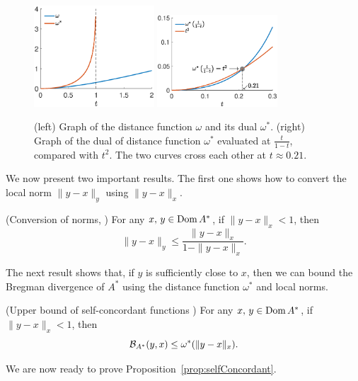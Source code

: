 \begin{figure}[ht]
	\centering
	\includegraphics[width=0.4\textwidth]{figs/self_concordance/omega.eps}
	\includegraphics[width=0.4\textwidth]{figs/self_concordance/omega_star.eps}
	\caption{(left) Graph of the distance function $\omega$ and its dual $\omega^*$. (right) Graph of the dual of distance function $\omega^*$ evaluated at $\frac{t}{1-t}$, compared with $t^2$. The two curves cross each other at $t\approx 0.21$.}
	\label{fig:omega}
\end{figure}

We now present two important results. The first one shows how to convert the local norm $\|y-x\|_y$ using $\|y-x\|_x$.
\begin{proposition}\label{prop:conversion_norm}
	(Conversion of norms, \citep[Theorem 4.1.5]{nesterov2003introductory}) For any $x,\,y\in\operatorname{\mathrm{Dom}} A^*$, if $\|y-x\|_x<1$, then
	\[
		\|y-x\|_y \leq \frac{\|y-x\|_x}{1-\|y-x\|_x}.
	\]
\end{proposition}

The next result shows that, if $y$ is sufficiently close to $x$, then we can bound the Bregman divergence of $A^*$ using the distance function $\omega^*$ and local norms.
\begin{proposition}(Upper bound of self-concordant functions \citep[Theorem 4.1.8]{nesterov2003introductory}) \label{prop:upper_bound_self_concordance}
	For any $x,\,y\in\operatorname{\mathrm{Dom}} A^*$, if $\|y-x\|_x<1$, then
	\[
		{\mathcal B}_{A^*}(y,x) \leq \omega^*(\|y-x\|_x).
	\]
\end{proposition}

We are now ready to prove Proposition~\ref{prop:selfConcordant}.


